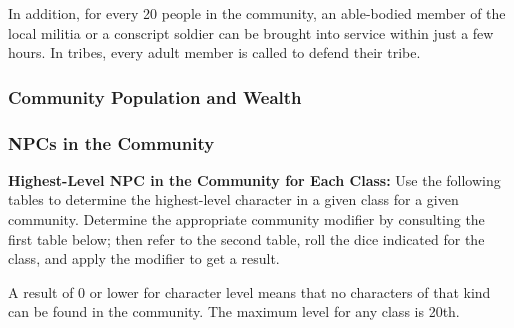 In addition, for every 20 people in the community, an able-bodied member of the local militia or a conscript soldier can be brought into service within just a few hours. In tribes, every adult member is called to defend their tribe. 

\subsubsection{Community Population and Wealth}
\subsubsection{NPCs in the Community}
\textbf{Highest-Level NPC in the Community for Each Class:} Use the following tables to determine the highest-level character in a given class for a given community. Determine the appropriate community modifier by consulting the first table below; then refer to the second table, roll the dice indicated for the class, and apply the modifier to get a result.

A result of 0 or lower for character level means that no characters of that kind can be found in the community. The maximum level for any class is 20th.



